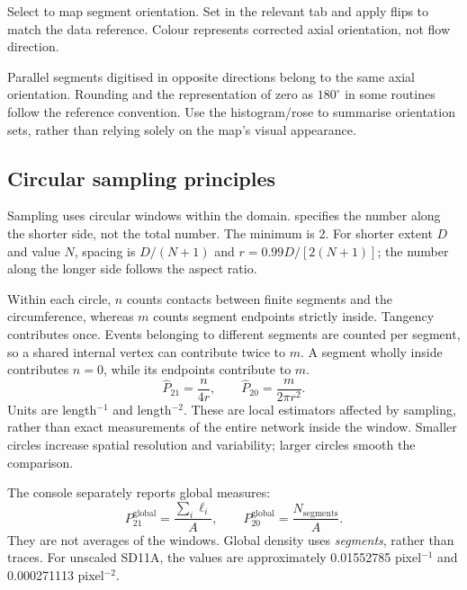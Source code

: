 Select  to map segment orientation. Set  in the relevant tab and apply flips to match the data reference. Colour represents corrected axial orientation, not flow direction.

Parallel segments digitised in opposite directions belong to the same axial orientation. Rounding and the representation of zero as \(180^\circ\) in some routines follow the reference convention. Use the histogram/rose to summarise orientation sets, rather than relying solely on the map's visual appearance.

\subsection{Circular sampling principles}\label{sec:circular}
Sampling uses circular windows within the domain.  specifies the number along the shorter side, not the total number. The minimum is 2. For shorter extent \(D\) and value \(N\), spacing is \(D/(N+1)\) and \(r=0.99D/[2(N+1)]\); the number along the longer side follows the aspect ratio.

Within each circle, \(n\) counts contacts between finite segments and the circumference, whereas \(m\) counts segment endpoints strictly inside. Tangency contributes once. Events belonging to different segments are counted per segment, so a shared internal vertex can contribute twice to \(m\). A segment wholly inside contributes \(n=0\), while its endpoints contribute to \(m\).
\begin{equation}
\widehat P_{21}=\frac{n}{4r},\qquad
\widehat P_{20}=\frac{m}{2\pi r^2}.
\label{eq:circle}
\end{equation}
Units are length\(^{-1}\) and length\(^{-2}\). These are local estimators affected by sampling, rather than exact measurements of the entire network inside the window. Smaller circles increase spatial resolution and variability; larger circles smooth the comparison.

The console separately reports global measures:
\begin{equation}
P_{21}^{\mathrm{global}}=\frac{\sum_i\ell_i}{A},\qquad
P_{20}^{\mathrm{global}}=\frac{N_{\mathrm{segments}}}{A}.
\end{equation}
They are not averages of the windows. Global density uses \emph{segments}, rather than traces. For unscaled SD11A, the values are approximately 0.01552785 pixel\(^{-1}\) and 0.000271113 pixel\(^{-2}\).

